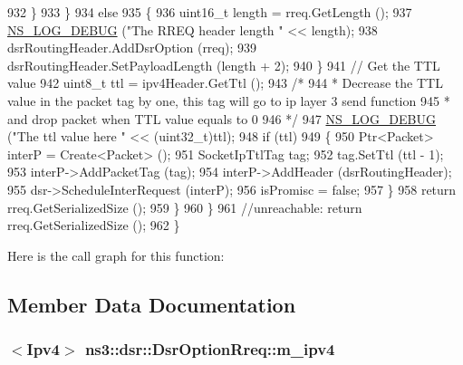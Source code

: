 \begin{DoxyCode}
932                 \}
933             \}
934           \textcolor{keywordflow}{else}
935             \{
936               uint16\_t length = rreq.GetLength ();
937               \hyperlink{group__logging_ga413f1886406d49f59a6a0a89b77b4d0a}{NS\_LOG\_DEBUG} (\textcolor{stringliteral}{"The RREQ header length "} <<  length);
938               dsrRoutingHeader.AddDsrOption (rreq);
939               dsrRoutingHeader.SetPayloadLength (length + 2);
940             \}
941           \textcolor{comment}{// Get the TTL value}
942           uint8\_t ttl = ipv4Header.GetTtl ();
943           \textcolor{comment}{/*}
944 \textcolor{comment}{          * Decrease the TTL value in the packet tag by one, this tag will go to ip layer 3 send function}
945 \textcolor{comment}{          * and drop packet when TTL value equals to 0}
946 \textcolor{comment}{          */}
947           \hyperlink{group__logging_ga413f1886406d49f59a6a0a89b77b4d0a}{NS\_LOG\_DEBUG} (\textcolor{stringliteral}{"The ttl value here "} << (uint32\_t)ttl);
948           \textcolor{keywordflow}{if} (ttl)
949             \{
950               Ptr<Packet> interP = Create<Packet> ();
951               SocketIpTtlTag tag;
952               tag.SetTtl (ttl - 1);
953               interP->AddPacketTag (tag);
954               interP->AddHeader (dsrRoutingHeader);
955               dsr->ScheduleInterRequest (interP);
956               isPromisc = \textcolor{keyword}{false};
957             \}
958           \textcolor{keywordflow}{return} rreq.GetSerializedSize ();
959         \}
960     \}
961   \textcolor{comment}{//unreachable:  return rreq.GetSerializedSize ();}
962 \}
\end{DoxyCode}


Here is the call graph for this function\+:




\subsection{Member Data Documentation}
\subsubsection[{\texorpdfstring{m\+\_\+ipv4}{m_ipv4}}]{$<${\bf Ipv4}$>$ ns3\+::dsr\+::\+Dsr\+Option\+Rreq\+::m\+\_\+ipv4\hspace{0.3cm}{\ttfamily [private]}}\hypertarget{classns3_1_1dsr_1_1DsrOptionRreq_a1cdb6d76fdbe652b4bb48e46e7aeb5d2}{}\label{classns3_1_1dsr_1_1DsrOptionRreq_a1cdb6d76fdbe652b4bb48e46e7aeb5d2}


